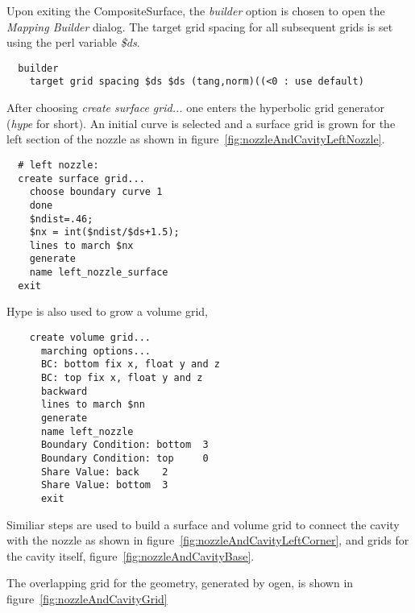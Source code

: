 Upon exiting the CompositeSurface, the {\em builder} option is chosen to open 
the {\em Mapping Builder} dialog.
The target grid spacing for all subsequent grids is set using the perl variable {\em \$ds}.
{\vbsize
\begin{verbatim}
  builder
    target grid spacing $ds $ds (tang,norm)((<0 : use default)
\end{verbatim}
}
After choosing {\em create surface grid...} one enters the hyperbolic grid generator ({\em hype} for short).
An initial curve is selected and a surface grid is grown for the left section of
the nozzle as shown
in figure~\ref{fig:nozzleAndCavityLeftNozzle}.
{\vbsize
\begin{verbatim}
  # left nozzle:
  create surface grid...
    choose boundary curve 1
    done
    $ndist=.46;
    $nx = int($ndist/$ds+1.5);
    lines to march $nx
    generate
    name left_nozzle_surface
  exit
\end{verbatim}
}
\noindent Hype is also used to grow a volume grid,
{\vbsize
\begin{verbatim}
    create volume grid...
      marching options...
      BC: bottom fix x, float y and z
      BC: top fix x, float y and z
      backward
      lines to march $nn
      generate
      name left_nozzle
      Boundary Condition: bottom  3
      Boundary Condition: top     0
      Share Value: back    2
      Share Value: bottom  3
      exit
\end{verbatim}
}

Similiar steps are used to build a surface and volume grid to connect the
cavity with the nozzle as shown in figure~\ref{fig:nozzleAndCavityLeftCorner},
and grids for the cavity itself, figure~\ref{fig:nozzleAndCavityBase}.





The overlapping grid for the geometry, generated by ogen, is shown in figure~\ref{fig:nozzleAndCavityGrid}


